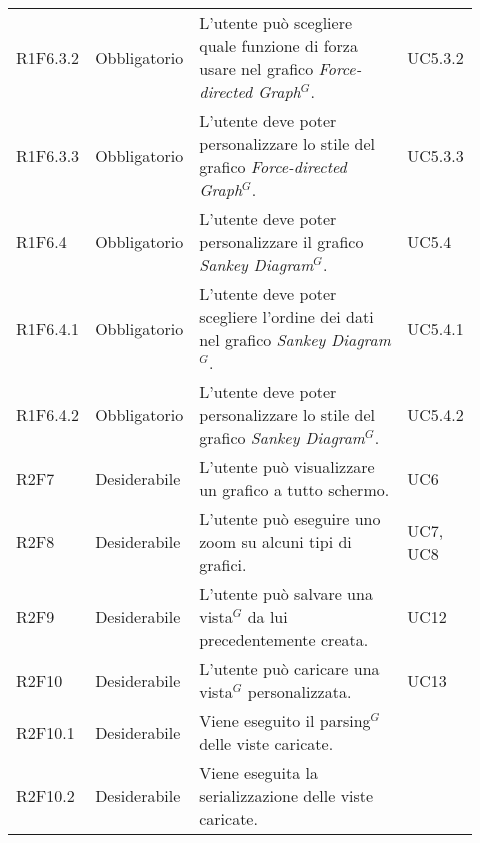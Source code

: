 {\begin{longtable}{p{0.12\linewidth}p{0.15\linewidth}p{0.50\linewidth}p{0.15\linewidth}}
    \rowcolor[RGB]{233, 245, 206}
    R1F6.3.2 & Obbligatorio & L'utente può scegliere quale funzione di forza usare nel grafico \textit{Force-directed Graph$^{G}$}. & UC5.3.2\\
    \rowcolor[RGB]{216, 235, 171}
    R1F6.3.3 & Obbligatorio & L'utente deve poter personalizzare lo stile del grafico \textit{Force-directed Graph$^{G}$}. & UC5.3.3\\
    \rowcolor[RGB]{233, 245, 206}
    R1F6.4 & Obbligatorio & L'utente deve poter personalizzare il grafico \textit{Sankey Diagram$^{G}$}. & UC5.4\\
    \rowcolor[RGB]{216, 235, 171}
    R1F6.4.1 & Obbligatorio & L'utente deve poter scegliere l'ordine dei dati nel grafico \textit{Sankey Diagram$^{G}$}. & UC5.4.1\\
    \rowcolor[RGB]{233, 245, 206}
    R1F6.4.2 & Obbligatorio & L'utente deve poter personalizzare lo stile del grafico \textit{Sankey Diagram$^{G}$}. & UC5.4.2\\

    \rowcolor[RGB]{216, 235, 171}
    R2F7 & Desiderabile & L'utente può visualizzare un grafico a tutto schermo. & UC6\\
    
    \rowcolor[RGB]{233, 245, 206}
    R2F8 & Desiderabile & L'utente può eseguire uno zoom su alcuni tipi di grafici. & UC7, UC8\\
    
    \rowcolor[RGB]{216, 235, 171}
    R2F9 & Desiderabile & L'utente può salvare una vista$^{G}$ da lui precedentemente creata. & UC12\\
    
    \rowcolor[RGB]{233, 245, 206}
    R2F10 & Desiderabile & L'utente può caricare una vista$^{G}$ personalizzata.  & UC13\\
    \rowcolor[RGB]{216, 235, 171}
    R2F10.1 & Desiderabile & Viene eseguito il parsing$^{G}$ delle viste caricate. & \\
    \rowcolor[RGB]{233, 245, 206}
    R2F10.2 & Desiderabile & Viene eseguita la serializzazione delle viste caricate. & \\


\end{longtable}}
